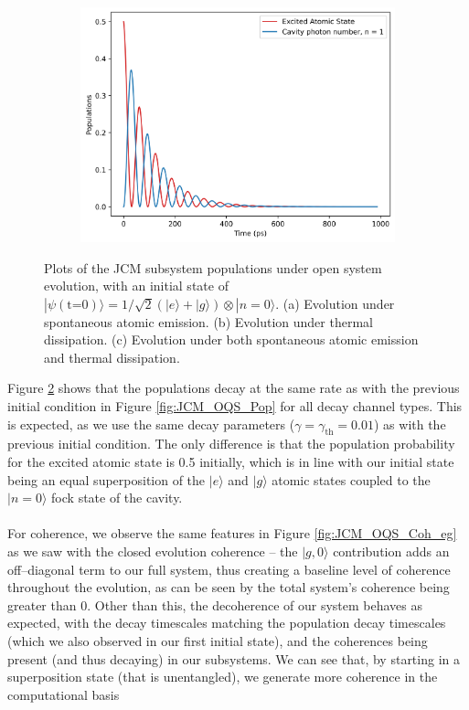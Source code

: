\documentclass[11pt]{article}
\begin{document}
\begin{figure}[H]
    \vspace{0.5cm}
    
    \begin{subfigure}{0.45\textwidth}
        \centering
        \includegraphics[width=\linewidth]{Research Project/Code/results/JCM/OQS_Pop_Both_eg.png}
        \caption{}
        \label{fig:JCM_OQS_Pop_Both_eg}
    \end{subfigure}
    \hfill

    \caption{Plots of the JCM subsystem populations under open system evolution, with an initial state of $|\psi (\text{t=0})\rangle = 1/\sqrt{2}(|e\rangle + |g\rangle)\otimes|n=0\rangle$. (a) Evolution under spontaneous atomic emission. (b) Evolution under thermal dissipation. (c) Evolution under both spontaneous atomic emission and thermal dissipation.}
    \label{fig:JCM_OQS_Pop_eg}
\end{figure}

\noindent Figure \ref{fig:JCM_OQS_Pop_eg} shows that the populations decay at the same rate as with the previous initial condition in Figure \ref{fig:JCM_OQS_Pop} for all decay channel types. This is expected, as we use the same decay parameters ($\gamma= \gamma_{\scriptscriptstyle \text{th}} = 0.01$) as with the previous initial condition. The only difference is that the population probability for the excited atomic state is 0.5 initially, which is in line with our initial state being an equal superposition of the $|e\rangle$ and $|g\rangle$ atomic states coupled to the $|n=0\rangle$ fock state of the cavity. \\
\\
For coherence, we observe the same features in Figure \ref{fig:JCM_OQS_Coh_eg} as we saw with the closed evolution coherence  -- the $|g,0\rangle$ contribution adds an off--diagonal term to our full system, thus creating a baseline level of coherence throughout the evolution, as can be seen by the total system's coherence being greater than 0. Other than this, the decoherence of our system behaves as expected, with the decay timescales matching the population decay timescales (which we also observed in our first initial state), and the coherences being present (and thus decaying) in our subsystems. We can see that, by starting in a superposition state (that is unentangled), we generate more coherence in the computational basis
\end{document}
